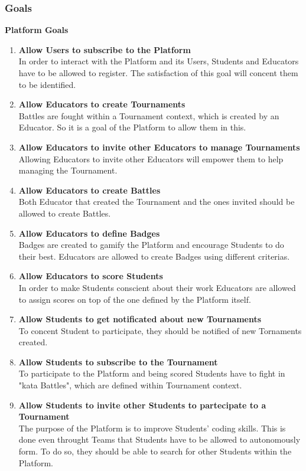 \newpage

\subsubsection{Goals}
\textbf{Platform Goals}
\begin{enumerate}[label=$\bullet$ \textbf{GP\arabic*:}]
    \item \textbf{Allow Users to subscribe to the Platform}\\In order to interact with the Platform and its Users, Students and Educators have to be allowed to register. The satisfaction of this goal will concent them to be identified.
    \item \textbf{Allow Educators to create Tournaments}\\Battles are fought within a Tournament context, which is created by an Educator. So it is a goal of the Platform to allow them in this. 
    \item \textbf{Allow Educators to invite other Educators to manage Tournaments}\\Allowing Educators to invite other Educators will empower them to help managing the Tournament. 
    \item \textbf{Allow Educators to create Battles}\\Both Educator that created the Tournament and the ones invited should be allowed to create Battles. 
    \item \textbf{Allow Educators to define Badges}\\Badges are created to gamify the Platform and encourage Students to do their best. Educators are allowed to create Badges using different criterias.
    \item \textbf{Allow Educators to score Students}\\In order to make Students conscient about their work Educators are allowed to assign scores on top of the one defined by the Platform itself.
    \item \textbf{Allow Students to get notificated about new Tournaments}\\To concent Student to participate, they should be notified of new Tornaments created.
    \item \textbf{Allow Students to subscribe to the Tournament}\\To participate to the Platform and being scored Students have to fight in "kata Battles", which are defined within Tournament context.
    \item \textbf{Allow Students to invite other Students to partecipate to a Tournament}\\The purpose of the Platform is to improve Students' coding skills. This is done even throught Teams that Students have to be allowed to autonomously form. To do so, they should be able to search for other Students within the Platform.
\end{enumerate}
